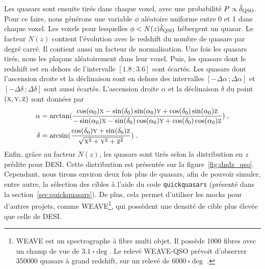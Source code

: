Les quasars sont ensuite tirés dans chaque voxel, avec une probabilité $P \propto \hat \delta_{\textsc{QSO}}$. Pour ce faire, nous générons une variable $\phi$ aléatoire uniforme entre 0 et 1 dans chaque voxel. Les voxels pour lesquelles $\phi < N(z) \hat \delta_{\textsc{QSO}}$ hébergent un quasar.
Le facteur $N(z)$ contient l'évolution avec le redshift du nombre de quasars par degré carré. Il contient aussi un facteur de normalisation.
Une fois les quasars tirés, nous les plaçons aléatoirement dans leur voxel.
Puis, les quasars dont le redshift est en dehors de l'intervalle $[\num{1.8}\, ; \num{3.6}]$ sont écartés.
Les quasars dont l'ascension droite et la déclinaison sont en dehors des intervalles $[ - \Delta \alpha \, ; \Delta \alpha]$ et $[ - \Delta \delta \, ; \Delta \delta]$ sont aussi écartés.
L'ascension droite $\alpha$ et la déclinaison $\delta$ du point $(\textsc{x},\textsc{y},\textsc{z})$ sont données par
\begin{align}
  \label{eq:radec}
  \alpha &= \arctan(\frac{
  \cos(\alpha_0)\textsc{x} - \sin(\delta_0)\sin(\alpha_0)\textsc{y} + \cos(\delta_0)\sin(\alpha_0)\textsc{z}
  }{
  - \sin(\alpha_0)\textsc{x} - \sin(\delta_0)\cos(\alpha_0)\textsc{y} + \cos(\delta_0)\cos(\alpha_0)\textsc{z}
           }) \; ,\\
  \delta &= \arcsin(\frac{
           \cos(\delta_0)\textsc{y} + \sin(\delta_0) \textsc{z}
           }{
           \sqrt{\textsc{x}^2 + \textsc{y}^2 + \textsc{z}^2}
           }) \; .
\end{align}
Enfin, grâce au facteur $N(z)$, les quasars sont tirés selon la distribution en $z$ prédite pour DESI. Cette distribution est présentée sur la figure~\ref{fig:dndz_qso}. Cependant, nous tirons environ deux fois plus de quasars, afin de pouvoir simuler, entre autre, la sélection des cibles à l'aide du code \texttt{quickquasars} (présenté dans la section~\ref{sec:quickquasars}). De plus, cela permet d'utiliser les mocks pour d'autres projets, comme WEAVE\footnote{WEAVE est un spectrographe à fibre multi objet. Il possède \num{1000} fibres avec un champ de vue de $\SI{3.1}{\square\deg}$. Le relevé WEAVE-QSO prévoit d'observer \num{350000} quasars à grand redshift, sur un relevé de $\SI{6000}{\square\deg}$ \autocite{Pieri2016}.}, qui possèdent une densité de cible plus élevée que celle de DESI.
